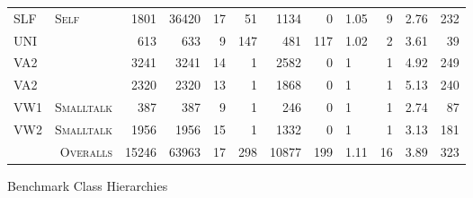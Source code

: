 \begin{figure}[htbp]
\begin{tabular}{@{ }l@{ }||@{ }l@{ }|@{ }r@{ }|@{ }r@{ }|@{ }r@{ }|@{ }r@{ }|@{ }r@{ }|@{ }r@{ }|@{ }l@{ }|@{ }r@{ }|@{ }r@{ }|@{ }r@{ }}
 SLF & \tiny{\textsc{Self}}        & 1801 & 36420 & 17 &  51 & 1134 &   0 & 1.05 &  9 & 2.76 & 232 \\ %
 UNI & \tiny{\textsc{\Cpp{}}}         &  613 &   633 &  9 & 147 &  481 & 117 & 1.02 &  2 & 3.61 &  39 \\ %
 VA2 & \tiny{\textsc{  }}          & 3241 &  3241 & 14 &   1 & 2582 &   0 & 1    &  1 & 4.92 & 249 \\ %
 VA2 & \tiny{\textsc{  }}          & 2320 &  2320 & 13 &   1 & 1868 &   0 & 1    &  1 & 5.13 & 240 \\ %
 VW1 & \tiny{\textsc{Smalltalk}}   &  387 &   387 &  9 &   1 &  246 &   0 & 1    &  1 & 2.74 &  87 \\ %
 VW2 & \tiny{\textsc{Smalltalk}}   & 1956 &  1956 & 15 &   1 & 1332 &   0 & 1    &  1 & 3.13 & 181 \\ %
\hline %
\multicolumn{2}{r|}{\tiny{\textsc{Overalls}}} &15246 & 63963 & 17 & 298 &10877 & 199 & 1.11 & 16 & 3.89 & 323 \\ %
\hline %
\end{tabular}
\caption{Benchmark Class Hierarchies}
\label{fig:benchmarks}
\end{figure}

